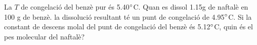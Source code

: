 \begin{qst}
La $T$ de congelació del benzè pur és 5.40$\degree$C. 
Quan es dissol 1.15g de naftalè en 100 g de benzè. la dissolució resultant té un punt de congelació de 4.95$\degree$C.
Si la constant de descens molal del punt de congelació del benzè és 5.12$\degree$C, quin és el pes molecular del naftalè?
\end{qst}
